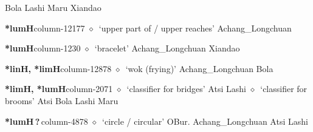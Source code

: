 \hspace{1ex}
         Bola 
\hspace{1ex}
         Lashi 
\hspace{1ex}
         Maru 
\hspace{1ex}
         Xiandao 
  \item {\footnotesize \textbf{*lumH}}{\tiny column-12177}
         $\diamond$~`upper part of / upper reaches'
         Achang\_Longchuan 
  \item {\footnotesize \textbf{*lumH}}{\tiny column-1230}
         $\diamond$~`bracelet'
         Achang\_Longchuan 
\hspace{1ex}
         Xiandao 
  \item {\footnotesize \textbf{*linH, *limH}}{\tiny column-12878}
         $\diamond$~`wok (frying)'
         Achang\_Longchuan 
\hspace{1ex}
         Bola 
  \item {\footnotesize \textbf{*limH, *lumH}}{\tiny column-2071}
         $\diamond$~`classifier for bridges'
         Atsi 
\hspace{1ex}
         Lashi 
\hspace{1ex}
         $\diamond$~`classifier for brooms'
         Atsi 
\hspace{1ex}
         Bola 
\hspace{1ex}
         Lashi 
\hspace{1ex}
         Maru 
  \item {\footnotesize \textbf{*lumH\,?\,}}{\tiny column-4878}
         $\diamond$~`circle / circular'
         OBur. 
\hspace{1ex}
         Achang\_Longchuan 
\hspace{1ex}
         Atsi 
\hspace{1ex}
         Lashi 
\hspace{1ex}
